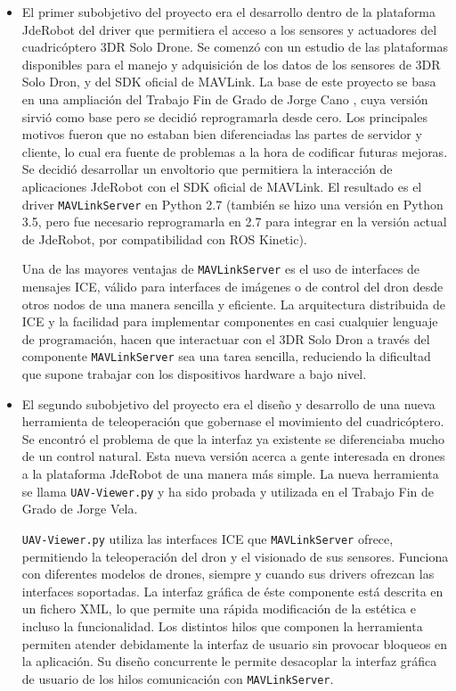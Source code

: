 \begin{itemize}
\item El primer subobjetivo del proyecto era el desarrollo dentro de la plataforma JdeRobot del driver que permitiera el acceso a los sensores y actuadores del cuadricóptero 3DR Solo Drone. Se comenzó con un estudio de las plataformas disponibles para el manejo y adquisición de los datos de los sensores de 3DR Solo Dron, y del SDK oficial de MAVLink. La base de este proyecto se basa en una ampliación del Trabajo Fin de Grado de Jorge Cano \cite{jorgeCano}, cuya versión sirvió como base pero se decidió reprogramarla desde cero. Los principales motivos fueron que no estaban bien diferenciadas las partes de servidor y cliente, lo cual era fuente de problemas a la hora de codificar futuras mejoras. Se decidió desarrollar un envoltorio que permitiera la interacción de aplicaciones JdeRobot con el SDK oficial de MAVLink. El resultado es el driver \texttt{MAVLinkServer} en Python 2.7 (también se hizo una versión en Python 3.5, pero fue necesario reprogramarla en 2.7 para integrar en la versión actual de JdeRobot, por compatibilidad con ROS Kinetic). 

Una de las mayores ventajas de \texttt{MAVLinkServer} es el uso de interfaces de mensajes ICE, válido para interfaces de imágenes o de control del dron desde otros nodos de una manera sencilla y eficiente. La arquitectura distribuida de ICE y la facilidad para implementar componentes en casi cualquier lenguaje de programación, hacen que interactuar con el 3DR Solo Dron a través del componente \texttt{MAVLinkServer} sea una tarea sencilla, reduciendo la dificultad que supone trabajar con los dispositivos hardware a bajo nivel.

\item El segundo subobjetivo del proyecto era el diseño y desarrollo de una nueva herramienta de teleoperación que gobernase el movimiento del cuadricóptero. Se encontró el problema de que la interfaz ya existente se diferenciaba mucho de un control natural. Esta nueva versión acerca a gente interesada en drones a la plataforma JdeRobot de una manera más simple. La nueva herramienta se llama \texttt{UAV-Viewer.py} y ha sido probada y utilizada en el Trabajo Fin de Grado de Jorge Vela\cite{jorgeVela}.

\texttt{UAV-Viewer.py} utiliza las interfaces ICE que \texttt{MAVLinkServer} ofrece, permitiendo la teleoperación del dron y el visionado de sus sensores. Funciona con diferentes modelos de drones, siempre y cuando sus drivers ofrezcan las interfaces soportadas. La interfaz gráfica de éste componente está descrita en un fichero XML, lo que permite una rápida modificación de la estética e incluso la funcionalidad. Los distintos hilos que componen la herramienta permiten atender debidamente la interfaz de usuario sin provocar bloqueos en la aplicación. Su diseño concurrente le permite desacoplar la interfaz gráfica de usuario de los hilos comunicación con \texttt{MAVLinkServer}.


\end{itemize}

